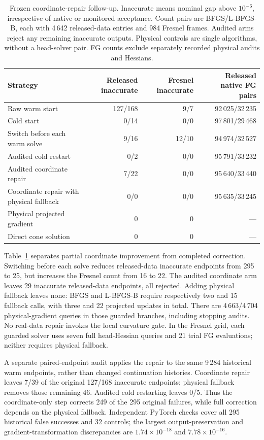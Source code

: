 \begin{table}[!t]
\caption{Frozen coordinate-repair follow-up. Inaccurate means nominal gap above $10^{-6}$, irrespective of native or monitored acceptance. Count pairs are BFGS/L-BFGS-B, each with 4\,642 released-data entries and 984 Fresnel frames. Audited arms reject any remaining inaccurate outputs. Physical controls are single algorithms, without a head-solver pair. FG counts exclude separately recorded physical audits and Hessians.}
\label{tab:chartrepair}
\centering\small\renewcommand{\arraystretch}{1.12}
\begin{tabularx}{\textwidth}{@{}Xrrr@{}}\toprule
Strategy & Released inaccurate & Fresnel inaccurate & Released native FG pairs\\\midrule
Raw warm start & 127/168 & 9/7 & 92\,025/32\,235\\
Cold start & 0/14 & 0/0 & 97\,801/29\,468\\
Switch before each warm solve & 9/16 & 12/10 & 94\,974/32\,527\\
Audited cold restart & 0/2 & 0/0 & 95\,791/33\,232\\
Audited coordinate repair & 7/22 & 0/0 & 95\,640/33\,440\\
Coordinate repair with physical fallback & 0/0 & 0/0 & 95\,635/33\,245\\
Physical projected gradient & 0 & 0 & ---\\
Direct cone solution & 0 & 0 & ---\\\bottomrule
\end{tabularx}
\end{table}

Table~\ref{tab:chartrepair} separates partial coordinate improvement from completed correction. Switching before each solve reduces released-data inaccurate endpoints from 295 to 25, but increases the Fresnel count from 16 to 22. The audited coordinate arm leaves 29 inaccurate released-data endpoints, all rejected. Adding physical fallback leaves none: BFGS and L-BFGS-B require respectively two and 15 fallback calls, with three and 22 projected updates in total. There are 4\,663/4\,704 physical-gradient queries in those guarded branches, including stopping audits. No real-data repair invokes the local curvature gate. In the Fresnel grid, each guarded solver uses seven full head-Hessian queries and 21 trial FG evaluations; neither requires physical fallback.

A separate paired-endpoint audit applies the repair to the same 9\,284 historical warm endpoints, rather than changed continuation histories. Coordinate repair leaves 7/39 of the original 127/168 inaccurate endpoints; physical fallback removes those remaining 46. Audited cold restarting leaves 0/5. Thus the coordinate-only step corrects 249 of the 295 original failures, while full correction depends on the physical fallback. Independent PyTorch checks cover all 295 historical false successes and 32 controls; the largest output-preservation and gradient-transformation discrepancies are $1.74\times10^{-18}$ and $7.78\times10^{-16}$.

